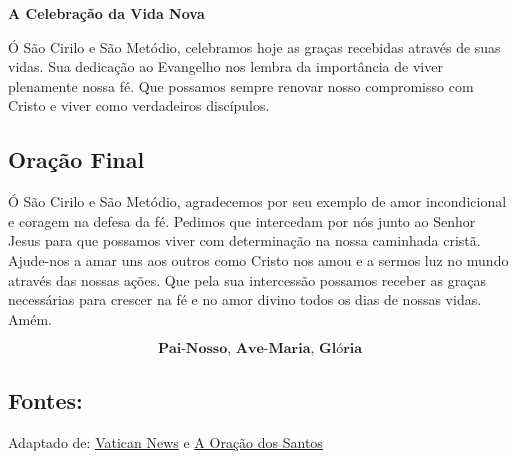 \documentclass[a4paper,14pt]{extarticle} \usepackage[utf8]{inputenc}
\begin{document}
\textbf{A Celebração da Vida Nova}

Ó São Cirilo e São Metódio, celebramos hoje as graças recebidas através de suas vidas. Sua dedicação ao Evangelho nos lembra da importância de viver plenamente nossa fé. Que possamos sempre renovar nosso compromisso com Cristo e viver como verdadeiros discípulos.


\underline{}

\subsection{Oração Final}\label{sub:final} %

Ó São Cirilo e São Metódio, agradecemos por seu exemplo de amor incondicional e coragem na defesa da fé. Pedimos que intercedam por nós junto ao Senhor Jesus para que possamos viver com determinação na nossa caminhada cristã. Ajude-nos a amar uns aos outros como Cristo nos amou e a sermos luz no mundo através das nossas ações. Que pela sua intercessão possamos receber as graças necessárias para crescer na fé e no amor divino todos os dias de nossas vidas. Amém.

\[\textbf{Pai-Nosso, Ave-Maria, Glória}\]


\vfill

\begin{center}
\subsection*{Fontes:}
Adaptado de: {\color{blue} \underline{\href{https://www.vaticannews.va/pt/santo-do-dia/02/14/ss--cirilo--monge-e-metodio--bispo---padroeiros-da-europa-.html}{Vatican News}}} e {\color{blue} \underline{\href{https://www.youtube.com/playlist?list=PLN7jQwkJvdQrb9mji8dOObIvV0iK1W7uU}{A Oração dos Santos}}}
\end{center}
\end{document}
